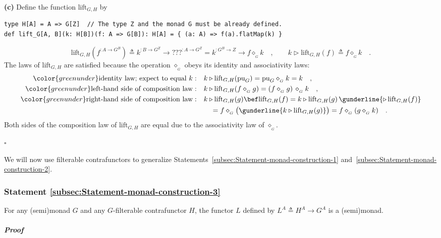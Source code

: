 \textbf{(c)} Define the function $\text{lift}_{G,H}$ by
\begin{lstlisting}
type H[A] = A => G[Z]  // The type Z and the monad G must be already defined.
def lift_G[A, B](k: H[B])(f: A => G[B]): H[A] = { (a: A) => f(a).flatMap(k) }
\end{lstlisting}
\[
\text{lift}_{G,H}(f^{:A\rightarrow G^{B}})\triangleq k^{:B\rightarrow G^{Z}}\rightarrow\text{???}^{:A\rightarrow G^{Z}}=k^{:G^{B}\rightarrow Z}\rightarrow f\diamond_{_{G}}k\quad,\quad\quad k\triangleright\text{lift}_{G,H}(f)\triangleq f\diamond_{_{G}}k\quad.
\]
The laws of $\text{lift}_{G,H}$ are satisfied because the operation
$\diamond_{_{G}}$ obeys its identity and associativity laws:
\begin{align*}
{\color{greenunder}\text{identity law; expect to equal }k:}\quad & k\triangleright\text{lift}_{G,H}(\text{pu}_{G})=\text{pu}_{G}\diamond_{_{G}}k=k\quad,\\
{\color{greenunder}\text{left-hand side of composition law}:}\quad & k\triangleright\text{lift}_{G,H}(f\diamond_{_{G}}g)=(f\diamond_{_{G}}g)\,\diamond_{_{G}}k\quad,\\
{\color{greenunder}\text{right-hand side of composition law}:}\quad & k\triangleright\text{lift}_{G,H}(g)\bef\text{lift}_{G,H}(f)=k\triangleright\text{lift}_{G,H}(g)\,\gunderline{\triangleright\,\text{lift}_{G,H}(f)}\\
 & \quad=f\diamond_{_{G}}\big(\gunderline{k\triangleright\text{lift}_{G,H}(g)}\big)=f\diamond_{_{G}}(g\diamond_{_{G}}k)\quad.
\end{align*}
Both sides of the composition law of $\text{lift}_{G,H}$ are equal
due to the associativity law of $\diamond_{_{G}}$.

$\square$

We will now use filterable contrafunctors to generalize Statements~\ref{subsec:Statement-monad-construction-1}
and~\ref{subsec:Statement-monad-construction-2}.

\subsubsection{Statement \label{subsec:Statement-monad-construction-3}\ref{subsec:Statement-monad-construction-3}}

For any (semi)monad $G$ and any $G$-filterable contrafunctor $H$,
the functor $L$ defined by $L^{A}\triangleq H^{A}\rightarrow G^{A}$
is a (semi)monad.

\subparagraph{Proof}

